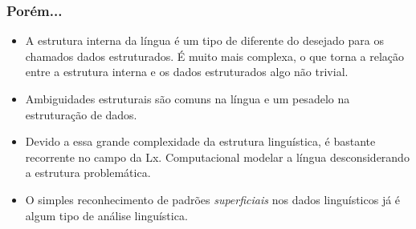 \documentclass[11pt]{beamer}
\begin{document}
\begin{frame}
\frametitle{Porém...}
\begin{itemize}
	\item <1-> A estrutura interna da língua é um tipo de diferente do desejado para os chamados dados estruturados. É muito mais complexa, o que torna a relação entre a estrutura interna e os dados estruturados algo não trivial.\\
	\item <2-> Ambiguidades estruturais são comuns na língua e um pesadelo na estruturação de dados.\\
	\item <3->Devido a essa grande complexidade da estrutura linguística, é bastante recorrente no campo da Lx. Computacional modelar a língua desconsiderando a estrutura problemática.\\
	\item <4->O simples reconhecimento de padrões \textit{superficiais} nos dados linguísticos já é algum tipo de análise linguística.\\
	
	
\end{itemize}
\end{frame}
\end{document}
